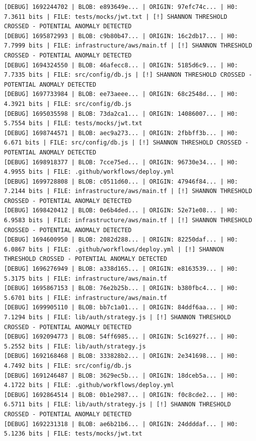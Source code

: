 \documentclass[12pt, a4paper, oneside]{report}
\begin{document}
\begin{lstlisting}[basicstyle=\tiny\ttfamily]
[DEBUG] 1692244702 | BLOB: e893649e... | ORIGIN: 97efc74c... | H0: 7.3611 bits | FILE: tests/mocks/jwt.txt | [!] SHANNON THRESHOLD CROSSED - POTENTIAL ANOMALY DETECTED
[DEBUG] 1695872993 | BLOB: c9b80b47... | ORIGIN: 16c2db17... | H0: 7.7999 bits | FILE: infrastructure/aws/main.tf | [!] SHANNON THRESHOLD CROSSED - POTENTIAL ANOMALY DETECTED
[DEBUG] 1694324550 | BLOB: 46afecc8... | ORIGIN: 5185d6c9... | H0: 7.7335 bits | FILE: src/config/db.js | [!] SHANNON THRESHOLD CROSSED - POTENTIAL ANOMALY DETECTED
[DEBUG] 1697733984 | BLOB: ee73aeee... | ORIGIN: 68c2548d... | H0: 4.3921 bits | FILE: src/config/db.js
[DEBUG] 1695035598 | BLOB: 73da2ca1... | ORIGIN: 14086007... | H0: 5.7554 bits | FILE: tests/mocks/jwt.txt
[DEBUG] 1698744571 | BLOB: aec9a273... | ORIGIN: 2fbbff3b... | H0: 6.671 bits | FILE: src/config/db.js | [!] SHANNON THRESHOLD CROSSED - POTENTIAL ANOMALY DETECTED
[DEBUG] 1698918377 | BLOB: 7cce75ed... | ORIGIN: 96730e34... | H0: 4.9955 bits | FILE: .github/workflows/deploy.yml
[DEBUG] 1699728808 | BLOB: c0511d60... | ORIGIN: 47946f84... | H0: 7.2144 bits | FILE: infrastructure/aws/main.tf | [!] SHANNON THRESHOLD CROSSED - POTENTIAL ANOMALY DETECTED
[DEBUG] 1698420412 | BLOB: 0e6b4ded... | ORIGIN: 52e71e08... | H0: 6.9583 bits | FILE: infrastructure/aws/main.tf | [!] SHANNON THRESHOLD CROSSED - POTENTIAL ANOMALY DETECTED
[DEBUG] 1694600950 | BLOB: 2082d288... | ORIGIN: 82250daf... | H0: 6.0867 bits | FILE: .github/workflows/deploy.yml | [!] SHANNON THRESHOLD CROSSED - POTENTIAL ANOMALY DETECTED
[DEBUG] 1696276949 | BLOB: a338d165... | ORIGIN: e8163539... | H0: 5.3175 bits | FILE: infrastructure/aws/main.tf
[DEBUG] 1695867153 | BLOB: 76e2b25b... | ORIGIN: b380fbc4... | H0: 5.6701 bits | FILE: infrastructure/aws/main.tf
[DEBUG] 1699905110 | BLOB: bb7c1a01... | ORIGIN: 84ddf6aa... | H0: 7.1294 bits | FILE: lib/auth/strategy.js | [!] SHANNON THRESHOLD CROSSED - POTENTIAL ANOMALY DETECTED
[DEBUG] 1692094773 | BLOB: 54ff6985... | ORIGIN: 5c16927f... | H0: 5.2552 bits | FILE: lib/auth/strategy.js
[DEBUG] 1692168468 | BLOB: 333828b2... | ORIGIN: 2e341698... | H0: 4.7492 bits | FILE: src/config/db.js
[DEBUG] 1691246487 | BLOB: 3629ec5b... | ORIGIN: 18dceb5a... | H0: 4.1722 bits | FILE: .github/workflows/deploy.yml
[DEBUG] 1692864514 | BLOB: 0b1e2987... | ORIGIN: f0c8cde2... | H0: 6.5711 bits | FILE: lib/auth/strategy.js | [!] SHANNON THRESHOLD CROSSED - POTENTIAL ANOMALY DETECTED
[DEBUG] 1692231318 | BLOB: ae6b21b6... | ORIGIN: 24ddddaf... | H0: 5.1236 bits | FILE: tests/mocks/jwt.txt

\end{lstlisting}
\end{document}
